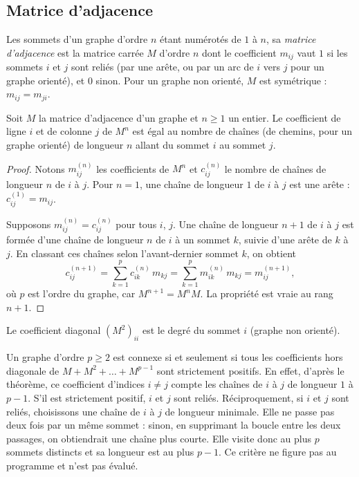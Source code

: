 \subsection{Matrice d'adjacence}
\begin{definition}
Les sommets d'un graphe d'ordre $n$ étant numérotés de $1$ à $n$, sa \emph{matrice d'adjacence} est la matrice carrée $M$ d'ordre $n$ dont le coefficient $m_{ij}$ vaut $1$ si les sommets $i$ et $j$ sont reliés (par une arête, ou par un arc de $i$ vers $j$ pour un graphe orienté), et $0$ sinon. Pour un graphe non orienté, $M$ est symétrique : $m_{ij}=m_{ji}$.
\end{definition}
\begin{theorem}
Soit $M$ la matrice d'adjacence d'un graphe et $n\ge1$ un entier. Le coefficient de ligne $i$ et de colonne $j$ de $M^n$ est égal au nombre de chaînes (de chemins, pour un graphe orienté) de longueur $n$ allant du sommet $i$ au sommet $j$.
\end{theorem}
\begin{proof}
Notons $m^{(n)}_{ij}$ les coefficients de $M^n$ et $c^{(n)}_{ij}$ le nombre de chaînes de longueur $n$ de $i$ à $j$. Pour $n=1$, une chaîne de longueur $1$ de $i$ à $j$ est une arête : $c^{(1)}_{ij}=m_{ij}$.\par
Supposons $m^{(n)}_{ij}=c^{(n)}_{ij}$ pour tous $i$, $j$. Une chaîne de longueur $n+1$ de $i$ à $j$ est formée d'une chaîne de longueur $n$ de $i$ à un sommet $k$, suivie d'une arête de $k$ à $j$. En classant ces chaînes selon l'avant-dernier sommet $k$, on obtient
\[c^{(n+1)}_{ij}=\sum_{k=1}^{p}c^{(n)}_{ik}\,m_{kj}=\sum_{k=1}^{p}m^{(n)}_{ik}\,m_{kj}=m^{(n+1)}_{ij},\]
où $p$ est l'ordre du graphe, car $M^{n+1}=M^nM$. La propriété est vraie au rang $n+1$.
\end{proof}
\begin{keypoint}[Conséquences]
Le coefficient diagonal $\left(M^2\right)_{ii}$ est le degré du sommet $i$ (graphe non orienté).
\end{keypoint}
\begin{beyond}Un graphe d'ordre $p\ge2$ est connexe si et seulement si tous les coefficients hors diagonale de $M+M^2+\dots+M^{p-1}$ sont strictement positifs. En effet, d'après le théorème, ce coefficient d'indices $i\neq j$ compte les chaînes de $i$ à $j$ de longueur $1$ à $p-1$. S'il est strictement positif, $i$ et $j$ sont reliés. Réciproquement, si $i$ et $j$ sont reliés, choisissons une chaîne de $i$ à $j$ de longueur minimale. Elle ne passe pas deux fois par un même sommet : sinon, en supprimant la boucle entre les deux passages, on obtiendrait une chaîne plus courte. Elle visite donc au plus $p$ sommets distincts et sa longueur est au plus $p-1$. Ce critère ne figure pas au programme et n'est pas évalué.\end{beyond}

